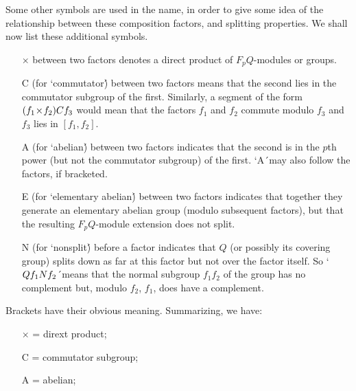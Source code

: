 {Some  other symbols are used  in the name, in order  to give some idea of
the   relationship  between these    composition  factors, and  splitting
properties. We shall now list these additional symbols.
\vspace{-2mm}
\begin{itemize}
\item[$\times$]  between  two  factors   denotes   a  direct  product  of
      $F_pQ$-modules or groups. \vspace{-2mm}
\item[C] (for `commutator\')  between two factors  means  that the second
      lies in the commutator subgroup of the first.  Similarly, a segment
      of the form  $(f_1 \! \times \! f_2) {\sl C} f_3$  would mean  that
      the factors $f_1$ and $f_2$  commute modulo $f_3$ and $f_3$ lies in
      $[f_1,f_2]$. \vspace{-2mm}
\item[A] (for `abelian\')  between two factors  indicates that the second
      is  in the  $p$th  power  (but not the commutator subgroup)  of the
      first.   `A\'\   may  also   follow  the  factors,   if  bracketed.
      \vspace{-7mm}
\item[E] (for `elementary abelian\')  between two factors  indicates that
      together   they  generate  an  elementary  abelian  group   (modulo
      subsequent factors), but that the resulting $F_pQ$-module extension
      does not split. \vspace{-2mm}
\item[N]  (for `nonsplit\')  before  a  factor  indicates  that  $Q$  (or
      possibly its covering group)  splits down as far at this factor but
      not over the factor itself.  So  `$Q f_1 {\sl N} f_2$\'\ means that
      the normal subgroup  $f_1f_2$  of the group  has no complement but,
      modulo $f_2$, $f_1$, does have a complement. \vspace{-2mm}
\end{itemize}
Brackets have their obvious meaning. Summarizing, we have:
\vspace{-4mm}
\begin{itemize}
\item[$\times$] = dirext product; \vspace{-2mm}
\item[C] = commutator subgroup; \vspace{-2mm}
\item[A] = abelian; \vspace{-2mm}

\end{itemize}}
